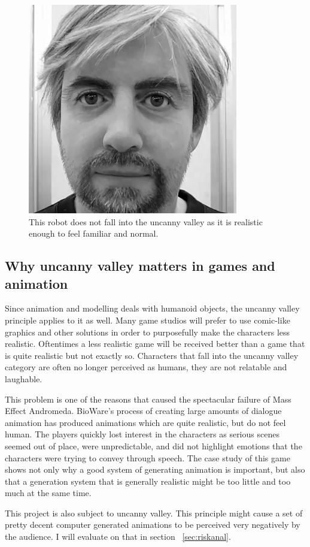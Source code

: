 \begin{figure}[H]
\centerline{\includegraphics[scale=0.45]{img/realrobot.png}}
\caption{This robot does not fall into the uncanny valley as it is realistic enough to feel familiar and normal.}\label{fig:realrobot}
\end{figure}

\subsection{Why uncanny valley matters in games and animation}

Since animation and modelling deals with humanoid objects, the uncanny valley principle applies to it as well. Many game studios will prefer to use comic-like graphics and other solutions in order to purposefully make the characters less realistic. Oftentimes a less realistic game will be received better than a game that is quite realistic but not exactly so. Characters that fall into the uncanny valley category are often no longer perceived as humans, they are not relatable and laughable.~\cite{uncannygames}

This problem is one of the reasons that caused the spectacular failure of Mass Effect Andromeda. BioWare's  process of creating large amounts of dialogue animation has produced animations which are quite realistic, but do not feel human. The players quickly lost interest in the characters as serious scenes seemed out of place, were unpredictable, and did not highlight emotions that the characters were trying to convey through speech. The case study of this game shows not only why a good system of generating animation is important, but also that a generation system that is generally realistic might be too little and too much at the same time.~\cite{uncannyandromeda}

This project is also subject to uncanny valley. This principle might cause a set of pretty decent computer generated animations to be perceived very negatively by the audience. I will evaluate on that in section ~\ref{sec:riskanal}.






